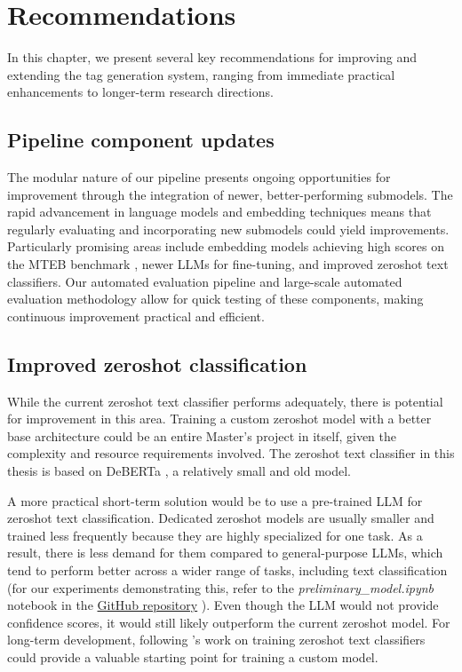 \chapter{Recommendations}
\label{chapter:recommendations}
In this chapter, we present several key recommendations for improving and extending the tag generation system, ranging from immediate practical enhancements to longer-term research directions.

\section{Pipeline component updates}
The modular nature of our pipeline presents ongoing opportunities for improvement through the integration of newer, better-performing submodels. The rapid advancement in language models and embedding techniques means that regularly evaluating and incorporating new submodels could yield improvements. Particularly promising areas include embedding models achieving high scores on the MTEB benchmark \cite{muennighoff_mteb_2023}, newer LLMs for fine-tuning, and improved zeroshot text classifiers. Our automated evaluation pipeline and large-scale automated evaluation methodology allow for quick testing of these components, making continuous improvement practical and efficient.

\section{Improved zeroshot classification} 
While the current zeroshot text classifier performs adequately, there is potential for improvement in this area. Training a custom zeroshot model with a better base architecture could be an entire Master's project in itself, given the complexity and resource requirements involved. The zeroshot text classifier in this thesis is based on DeBERTa \cite{he_deberta_2021}, a relatively small and old model.

A more practical short-term solution would be to use a pre-trained LLM for zeroshot text classification. Dedicated zeroshot models are usually smaller and trained less frequently because they are highly specialized for one task. As a result, there is less demand for them compared to general-purpose LLMs, which tend to perform better across a wider range of tasks, including text classification (for our experiments demonstrating this, refer to the \textit{preliminary\_model.ipynb} notebook in the \href{https://github.com/ivangermanov/openml-tags}{GitHub repository} \cite{germanov_topic_modeling_of_2024}). Even though the LLM would not provide confidence scores, it would still likely outperform the current zeroshot model. For long-term development, following \citet{laurer_building_2024}'s work on training zeroshot text classifiers could provide a valuable starting point for training a custom model.

